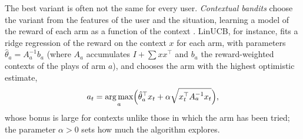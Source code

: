 The best variant is often not the same for every user. \emph{Contextual bandits} choose the variant from the features of the user and the
situation, learning a model of the reward of each arm as a function of the context \citep{li2010contextual}. LinUCB, for instance, fits a ridge
regression of the reward on the context $x$ for each arm, with parameters $\hat\theta_a=A_a^{-1}b_a$ (where $A_a$ accumulates $I+\sum xx^\top$ and
$b_a$ the reward-weighted contexts of the plays of arm $a$), and chooses the arm with the highest optimistic estimate,
\begin{equation}
  a_t=\operatorname*{arg\,max}_a\Bigl(\hat\theta_a^\top x_t+\alpha\sqrt{x_t^\top A_a^{-1}x_t}\Bigr),
\end{equation}
whose bonus is large for contexts unlike those in which the arm has been tried; the parameter $\alpha>0$ sets how much the algorithm explores.

